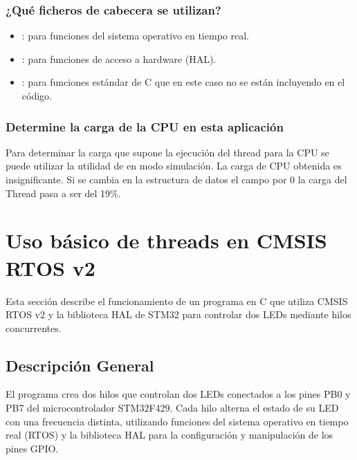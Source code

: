 \documentclass[letterpaper,10pt,english]{sphinxmanual}
\begin{document}
\subsection{¿Qué ficheros de cabecera se utilizan?}
\label{\detokenize{ejemplothread:que-ficheros-de-cabecera-se-utilizan}}\begin{itemize}
\item {} 
\sphinxAtStartPar
{}: para funciones del sistema operativo en tiempo real.

\item {} 
\sphinxAtStartPar
{}: para funciones de acceso a hardware (HAL).

\item {} 
\sphinxAtStartPar
{}: para funciones estándar de C que en este caso no se están incluyendo en el código.

\end{itemize}


\subsection{Determine la carga de la CPU en esta aplicación}
\label{\detokenize{ejemplothread:determine-la-carga-de-la-cpu-en-esta-aplicacion}}
\sphinxAtStartPar
Para determinar la carga que supone la ejecución del thread para la CPU se puede utilizar la utilidad de  en modo simulación.
La carga de CPU obtenida es insignificante. Si se cambia en la estructura de datos el campo  por 0 la carga del Thread pasa a ser del 19\%.

\sphinxstepscope


\chapter{Uso básico de threads en CMSIS RTOS v2}
\label{\detokenize{ejemplothreads:uso-basico-de-threads-en-cmsis-rtos-v2}}\label{\detokenize{ejemplothreads:ejemplothreads}}\label{\detokenize{ejemplothreads::doc}}
\sphinxAtStartPar
Esta sección describe el funcionamiento de un programa en C que utiliza CMSIS RTOS v2 y la biblioteca HAL de STM32 para controlar dos LEDs mediante hilos concurrentes.


\section{Descripción General}
\label{\detokenize{ejemplothreads:descripcion-general}}
\sphinxAtStartPar
El programa crea dos hilos que controlan dos LEDs conectados a los pines PB0 y PB7 del microcontrolador STM32F429. Cada hilo alterna el estado de su LED con una frecuencia distinta, utilizando funciones del sistema operativo en tiempo real (RTOS) y la biblioteca HAL para la configuración y manipulación de los pines GPIO.
\end{document}

